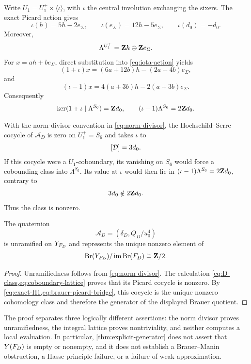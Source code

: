 Write \(U_1=U_1^+\times\langle\iota\rangle\), with \(\iota\) the central
involution exchanging the sixers.  The exact Picard action gives
\begin{equation}
 \iota(h)=5h-2e_\Sigma,\qquad
 \iota(e_\Sigma)=12h-5e_\Sigma,\qquad
 \iota(d_0)=-d_0.
\label{eq:iota-action}
\end{equation}
Moreover,
\begin{equation}
 \Lambda^{U_1^+}=\mathbf Z h\oplus\mathbf Z e_\Sigma.
\label{eq:S6-invariants}
\end{equation}
For \(x=ah+be_\Sigma\), direct substitution into
\cref{eq:iota-action} yields
\[
 (1+\iota)x=(6a+12b)h-(2a+4b)e_\Sigma,
\]
and
\[
 (\iota-1)x=4(a+3b)h-2(a+3b)e_\Sigma.
\]
Consequently
\begin{equation}
 \ker(1+\iota\mid\Lambda^{S_6})=\mathbf Z d_0,\qquad
 (\iota-1)\Lambda^{S_6}=2\mathbf Z d_0.
\label{eq:coboundary-lattice}
\end{equation}

With the norm-divisor convention in \cref{eq:norm-divisor}, the
Hochschild--Serre cocycle of \(\mathcal A_D\) is zero on \(U_1^+=S_6\) and
takes \(\iota\) to
\[
 [\mathcal D]=3d_0.
\]
If this cocycle were a \(U_1\)-coboundary, its vanishing on \(S_6\) would
force a cobounding class into \(\Lambda^{S_6}\).  Its value at \(\iota\)
would then lie in \((\iota-1)\Lambda^{S_6}=2\mathbf Z d_0\), contrary to
\[
 3d_0\notin2\mathbf Z d_0.
\]
Thus the class is nonzero.

\begin{theorem}
\label{thm:explicit-generator}
The quaternion
\[
 \mathcal A_D=(\delta_D,Q_D/u_0^4)
\]
is unramified on \(Y_{F_D}\) and represents the unique nonzero element of
\[
 \operatorname{Br}(Y_{F_D})/\operatorname{im}\operatorname{Br}(F_D)\cong\mathbf Z/2.
\]
\end{theorem}

\begin{proof}
Unramifiedness follows from \cref{eq:norm-divisor}.  The calculation
\cref{eq:D-class,eq:coboundary-lattice} proves that its Picard cocycle is
nonzero.  By \cref{eq:exact-H1,eq:brauer-picard-bridge}, this cocycle is the
unique nonzero cohomology class and therefore the generator of the displayed
Brauer quotient.
\end{proof}

\begin{remark}
The proof separates three logically different assertions: the norm divisor
proves unramifiedness, the integral lattice proves nontriviality, and neither
computes a local evaluation.  In particular,
\cref{thm:explicit-generator} does not assert that \(Y(F_D)\) is empty or
nonempty, and it does not establish a Brauer--Manin obstruction, a
Hasse-principle failure, or a failure of weak approximation.
\end{remark}
